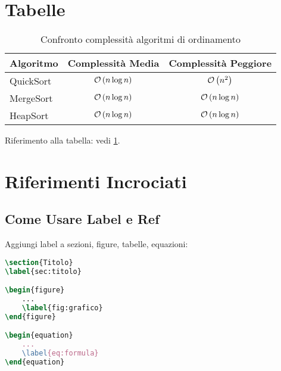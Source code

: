 \documentclass{csnotes}
\begin{document}

\section{Tabelle}

\begin{table}[h]
\centering
\begin{tabular}{|l|c|c|}
\hline
\textbf{Algoritmo} & \textbf{Complessità Media} & \textbf{Complessità Peggiore} \\
\hline
QuickSort & \(\mathcal{O}\left(n \log n\right)\) & \(\mathcal{O}\left(n^2\right)\) \\
MergeSort & \(\mathcal{O}\left(n \log n\right)\) & \(\mathcal{O}\left(n \log n\right)\) \\
HeapSort & \(\mathcal{O}\left(n \log n\right)\) & \(\mathcal{O}\left(n \log n\right)\) \\
\hline
\end{tabular}
\caption{Confronto complessità algoritmi di ordinamento}
\label{tab:sorting}
\end{table}

Riferimento alla tabella: vedi \cref{tab:sorting}.


\section{Riferimenti Incrociati}

\subsection{Come Usare Label e Ref}

\begin{example}
Aggiungi label a sezioni, figure, tabelle, equazioni:
\begin{lstlisting}[language=TeX]
\section{Titolo}
\label{sec:titolo}

\begin{figure}
    ...
    \label{fig:grafico}
\end{figure}

\begin{equation}
    ...
    \label{eq:formula}
\end{equation}
\end{lstlisting}
\end{example}
\end{document}
